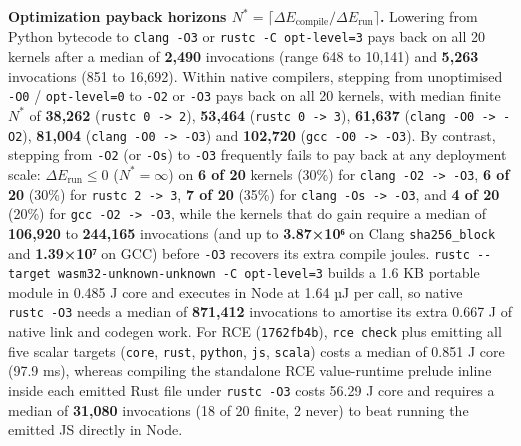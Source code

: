\documentclass[10pt,letterpaper]{article}
\begin{document}
\textbf{Optimization payback horizons
\(N^* = \lceil \Delta E_{\text{compile}} / \Delta E_{\text{run}} \rceil\).}
Lowering from Python bytecode to \texttt{clang\ -\allowbreak{}O3} or
\texttt{rustc\ -\allowbreak{}C\ opt-\allowbreak{}level=3} pays back on all 20 kernels after a
median of \textbf{2,490} invocations (range 648 to 10,141) and
\textbf{5,263} invocations (851 to 16,692). Within native compilers,
stepping from unoptimised \texttt{-O0} / \texttt{opt-\allowbreak{}level=0} to
\texttt{-O2} or \texttt{-O3} pays back on all 20 kernels, with median
finite \(N^*\) of \textbf{38,262}
(\texttt{rustc\ 0\ -\textgreater{}\ 2}), \textbf{53,464}
(\texttt{rustc\ 0\ -\textgreater{}\ 3}), \textbf{61,637}
(\texttt{clang\ -O0\ -\textgreater{}\ -O2}), \textbf{81,004}
(\texttt{clang\ -O0\ -\textgreater{}\ -O3}) and \textbf{102,720}
(\texttt{gcc\ -O0\ -\textgreater{}\ -O3}). By contrast, stepping from
\texttt{-O2} (or \texttt{-Os}) to \texttt{-O3} frequently fails to pay
back at any deployment scale: \(\Delta E_{\text{run}} \le 0\)
(\(N^* = \infty\)) on \textbf{6 of 20} kernels (30\%) for
\texttt{clang\ -O2\ -\textgreater{}\ -O3}, \textbf{6 of 20} (30\%) for
\texttt{rustc\ 2\ -\textgreater{}\ 3}, \textbf{7 of 20} (35\%) for
\texttt{clang\ -Os\ -\textgreater{}\ -O3}, and \textbf{4 of 20} (20\%)
for \texttt{gcc\ -O2\ -\textgreater{}\ -O3}, while the kernels that do
gain require a median of \textbf{106,920} to \textbf{244,165}
invocations (and up to \textbf{3.87×10⁶} on Clang \texttt{sha256\_\allowbreak{}block}
and \textbf{1.39×10⁷} on GCC) before \texttt{-O3} recovers its extra
compile joules.
\texttt{rustc\ -\allowbreak{}\/\allowbreak{}-\allowbreak{}target\ wasm32-\allowbreak{}unknown-\allowbreak{}unknown\ -\allowbreak{}C\ opt-\allowbreak{}level=3}
builds a 1.6 KB portable module in 0.485 J core and executes in Node at
1.64 µJ per call, so native \texttt{rustc\ -\allowbreak{}O3} needs a median of
\textbf{871,412} invocations to amortise its extra 0.667 J of native
link and codegen work. For RCE (\texttt{1762fb4b}), \texttt{rce\ check}
plus emitting all five scalar targets (\texttt{core}, \texttt{rust},
\texttt{python}, \texttt{js}, \texttt{scala}) costs a median of 0.851 J
core (97.9 ms), whereas compiling the standalone RCE value-runtime
prelude inline inside each emitted Rust file under \texttt{rustc\ -\allowbreak{}O3}
costs 56.29 J core and requires a median of \textbf{31,080} invocations
(18 of 20 finite, 2 never) to beat running the emitted JS directly in
Node.
\end{document}

